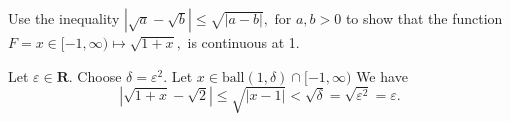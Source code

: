 \documentclass[12pt,fleqn,answers]{exam}
\newcommand{\reals}{\mathbf{R}}
\newcommand{\ball}{\mathrm{ball}}
\begin{document}
\begin{questions}
\question   Use the inequality
\(
   | \sqrt{a} - \sqrt{b} | \leq \sqrt{|a -b|},\mbox{ for } a,b > 0
\)
to show that the function
\(
   F = x \in [-1,\infty) \mapsto  \sqrt{1+x},
\)
is continuous at 1.

\begin{solution} Let $\varepsilon \in \reals$. Choose $\delta  = \varepsilon^2$. Let $x \in \ball(1,\delta) \cap [-1,\infty)$ We have
\[
   | \sqrt{1+x} - \sqrt{2} | \leq \sqrt{|x-1|} < \sqrt{\delta} = \sqrt{\varepsilon^2} = \varepsilon.
\]

\end{solution}
\end{questions}
\end{document}
